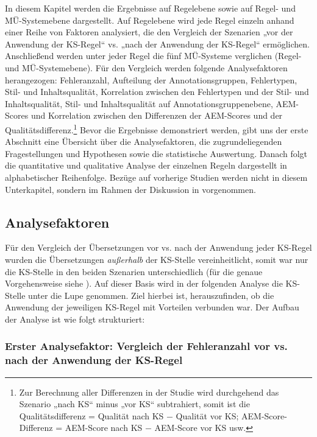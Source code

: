 In diesem Kapitel werden die Ergebnisse auf Regelebene sowie auf Regel- und MÜ-Systemebene dargestellt. Auf Regelebene wird jede Regel einzeln anhand einer Reihe von Faktoren analysiert, die den Vergleich der Szenarien „vor der Anwendung der KS-Regel“ vs. „nach der Anwendung der KS-Regel“ ermöglichen. Anschließend werden unter jeder Regel die fünf MÜ-Systeme verglichen (Regel- und MÜ-Systemebene). Für den Vergleich werden folgende Analysefaktoren herangezogen: Fehleranzahl, Aufteilung der Annotationsgruppen, Fehlertypen, Stil- und Inhaltsqualität, Korrelation zwischen den Fehlertypen und der Stil- und Inhaltsqualität, Stil- und Inhaltsqualität auf Annotationsgruppenebene, AEM-Scores und Korrelation zwischen den Differenzen der AEM-Scores und der Qualitätsdifferenz.\footnote{{{{Zur Berechnung aller Differenzen in der Studie wird durchgehend das Szenario „nach KS“ minus „vor KS“ subtrahiert, somit ist die Qualitätsdifferenz = Qualität nach KS $-$ Qualität vor KS; AEM-Score-Differenz = AEM-Score nach KS $-$ AEM-Score vor KS usw.}}}} Bevor die Ergebnisse demonstriert werden, gibt uns der erste Abschnitt eine Übersicht über die Analysefaktoren, die zugrundeliegenden Fragestellungen und Hypothesen sowie die statistische Auswertung. Danach folgt die quantitative und qualitative Analyse der einzelnen Regeln dargestellt in alphabetischer Reihenfolge. Bezüge auf vorherige Studien werden nicht in diesem Unterkapitel, sondern im Rahmen der Diskussion in  vorgenommen.

\subsection{Analysefaktoren}
\label{sec:5.3.0}
Für den Vergleich der Übersetzungen vor vs. nach der Anwendung jeder KS-Regel wurden die Übersetzungen \textit{außerhalb} der KS-Stelle vereinheitlicht, somit war nur die KS-Stelle in den beiden Szenarien unterschiedlich (für die genaue Vorgehensweise siehe ). Auf dieser Basis wird in der folgenden Analyse die KS-Stelle unter die Lupe genommen. Ziel hierbei ist, herauszufinden, ob die Anwendung der jeweiligen KS-Regel mit Vorteilen verbunden war. Der Aufbau der Analyse ist wie folgt strukturiert:

\subsubsection{Erster Analysefaktor: Vergleich der Fehleranzahl vor vs. nach der Anwendung der KS-Regel}

